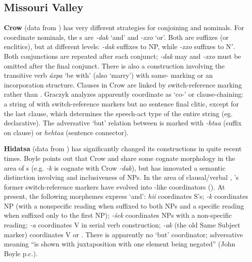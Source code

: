 \documentclass[output=paper]{LSP/langsci}
\begin{document}
\subsection{Missouri Valley}
 
\textbf{Crow} (data from \citealt{Graczyk2007}) has very different strategies for conjoining  and
nominals. For coordinate nominals, the s are \textit{-dak} `and' and \textit{-xxo} `or'. Both are suffixes (or enclitics), but at different levels: \textit{-dak} suffixes to NP, while \textit{-xxo} suffixes to N$'$. Both conjunctions are repeated after each conjunct; \textit{-dak} may and \textit{-xxo} must be omitted after the final conjunct. There is also a  construction involving the transitive verb \textit{áxpa} `be with' (also `marry') with same- marking or an incorporation structure. Clauses in Crow are linked by switch-reference marking rather than . Graczyk analyzes apparently coordinate  as `co-' or clause-chaining: a string of  with switch-reference markers but no sentence final clitic, except for the last clause, which determines the speech-act type of the entire string (eg. declarative). The adversative `but' relation between  is marked with \textit{-htaa} (suffix on clause) or \textit{hehtaa} (sentence connector).

\textbf{Hidatsa} (data from \citealt{Boyle2005,Boyle2007,Boyle2011}) has significantly changed its  constructions in quite recent times. Boyle points out that Crow and  share some cognate morphology in the area of s (e.g.  \textit{-k} is cognate with Crow \textit{-dak}), but  has innovated a semantic distinction involving  and inclusiveness of NPs. In the area of clausal/verbal , 's former switch-reference markers have evolved into -like coordinators (\citealt{Boyle2011}). At present, the following morphemes express `and': \textit{hii} coordinates S's; \textit{-k} coordinates NP (with a nonspecific reading when suffixed to both NPs and a specific reading when suffixed only to the first NP); \textit{-\v{s}ek} coordinates NPs with a non-specific reading; \textit{-a} coordinates V in serial verb construction; \textit{-ak} (the old Same Subject marker) coordinates V or . There is apparently no `but' coordinator; adversative meaning ``is shown with juxtaposition with one element being negated'' (John Boyle p.c.).
\end{document}
